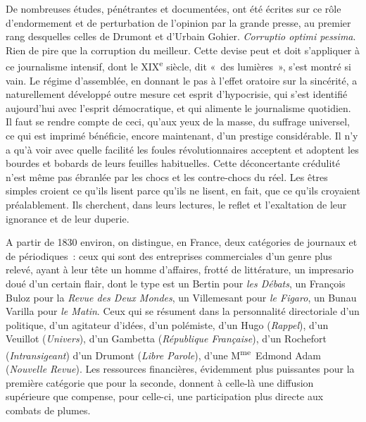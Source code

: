 \documentclass[french,twoside]{book} %
\begin{document}
De nombreuses études, pénétrantes et documentées, ont été écrites sur ce rôle d’endormement et de perturbation de l’opinion par la grande presse, au premier rang desquelles celles de Drumont et d’Urbain Gohier. {\itshape Corruptio optimi pessima}. Rien de pire que la corruption du meilleur. Cette devise peut et doit s’appliquer à ce journalisme intensif, dont le XIX\textsuperscript{e} siècle, dit « des lumières », s’est montré si vain. Le régime d’assemblée, en donnant le pas à l’effet oratoire sur la sincérité, a naturellement développé outre mesure cet esprit d’hypocrisie, qui s’est identifié aujourd’hui avec l’esprit démocratique, et qui alimente le journalisme quotidien. Il faut se rendre compte de ceci, qu’aux yeux de la masse, du suffrage universel, ce qui est imprimé bénéficie, encore maintenant, d’un prestige considérable. Il n’y a qu’à voir avec quelle facilité les foules révolutionnaires acceptent et adoptent les bourdes et bobards de leurs feuilles habituelles. Cette déconcertante crédulité n’est même pas ébranlée par les chocs et les contre-chocs du réel. Les êtres simples croient ce qu’ils lisent parce qu’ils ne lisent, en fait, que ce qu’ils croyaient préalablement. Ils cherchent, dans leurs lectures, le reflet et l’exaltation de leur ignorance et de leur duperie.\par
A partir de 1830 environ, on distingue, en France, deux catégories de journaux et de périodiques : ceux qui sont des entreprises commerciales d’un genre plus relevé, ayant à leur tête un homme d’affaires, frotté de littérature, un impresario doué d’un certain flair, dont le type est un Bertin pour {\itshape les Débats}, un François Buloz pour la {\itshape Revue des Deux Mondes}, un Villemesant pour {\itshape le Figaro}, un Bunau Varilla pour {\itshape le Matin}. Ceux qui se résument dans la personnalité directoriale d’un politique, d’un agitateur d’idées, d’un polémiste, d’un Hugo ({\itshape Rappel}), d’un Veuillot ({\itshape Univers}), d’un Gambetta ({\itshape République Française}), d’un Rochefort ({\itshape Intransigeant}) d’un Drumont ({\itshape Libre Parole}), d’une M\textsuperscript{me} Edmond Adam ({\itshape Nouvelle Revue}). Les ressources financières, évidemment plus puissantes pour la première catégorie que pour la seconde, donnent à celle-là une diffusion supérieure que compense, pour celle-ci, une participation plus directe aux combats de plumes.\par
\end{document}
